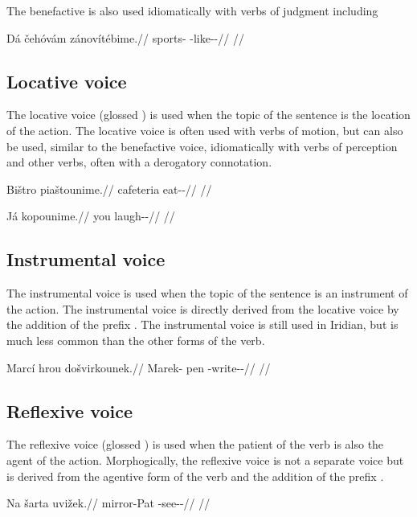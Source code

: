 The benefactive is also used idiomatically with verbs of judgment including
 

\pex
\begingl
\gla Dá čehóvám zánovítébime.//
\glb \First\Sg{} sports-\Agt{} \Neg{}-like-\Ben{}-\Prog{}//
\glft {}//
\endgl
\xe

\subsection{Locative voice}

The locative voice (glossed ) is used when the topic of the sentence is
the location of the action. The locative voice is often used with verbs of
motion, but can also be used, similar to the benefactive voice, idiomatically
with verbs of perception and other verbs, often with a derogatory connotation.

\pex
\begingl
\gla Bištro piaštounime.//
\glb cafeteria eat-\Loc{}-\Prog{}//
\glft {}//
\endgl
\xe

\pex
\begingl
\gla Já kopounime.//
\glb you laugh-\Lv{}-\Prog{}//
\glft {}//
\endgl
\xe

\subsection{Instrumental voice}

The instrumental voice is used when the topic of the sentence is an instrument
of the action. The instrumental voice is directly derived from the locative
voice by the addition of the prefix . The instrumental voice is still
used in Iridian, but is much less common than the other forms of the verb.

\pex
\begingl
\gla Marcí hrou došvirkounek.//
\glb Marek-\Gen{} pen \Ins{}-write-\Lv{}-\Pf{}//
\glft {}//
\endgl
\xe


\subsection{Reflexive voice}

The reflexive voice (glossed {\Refl}) is used when the patient of the verb is
also the agent of the action. Morphogically, the reflexive voice is not a
separate voice but is derived from the agentive form of the verb and the
addition of the prefix .

\pex
\begingl
\gla Na šarta uvižek.//
\glb \Loc{} mirror-Pat{} \Refl{}-see-\Av{}-\Pf{}//
\glft {}//
\endgl
\xe

